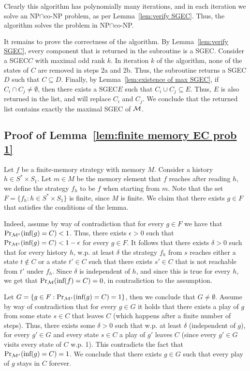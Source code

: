 \documentclass[runningheads,a4paper]{llncs}
\newcommand{\set}[1]{{\{#1\}}}
\newcommand{\M}{{\cal M}}
\newcommand{\Inf}{\mbox{inf}}
\newcommand{\sgec}{{SGEC}\xspace}
\begin{document}
Clearly this algorithm has polynomially many iterations, and in each iteration we solve an NP$\cap$co-NP problem, as per Lemma~\ref{lem:verify SGEC}. Thus, the algorithm solves the problem in NP$\cap$co-NP.

It remains to prove the correctness of the algorithm.
By Lemma~\ref{lem:verify SGEC}, every component that is returned in the subroutine is a \sgec. Consider a \sgec $C$ with maximal odd rank $k$. In iteration $k$ of the algorithm, none of the states of $C$ are removed in steps 2a and 2b. Thus, the subroutine returns a \sgec $D$ such that $C\subseteq D$. Finally, by Lemma~\ref{lem:existence of max SGEC}, if $C_i\cap C_j\neq \emptyset$, then there exists a \sgec $E$ such that $C_i\cup C_j\subseteq E$. Thus, $E$ is also returned in the list, and will replace $C_i$ and $C_j$.
We conclude that the returned list contains exactly the maximal \sgec of $\M$.


\subsection{Proof of Lemma~\ref{lem:finite memory EC prob 1}}
\label{apx:finite memory EC prob 1}
Let $f$ be a finite-memory strategy with memory $M$. Consider a history $h\in S^*\times S_1$. Let $m\in M$ be the memory element that $f$ reaches after reading $h$, we define the strategy $f_h$ to be $f$ when starting from $m$. Note that the set $F=\set{f_h:h\in S^*\times S_1}$ is finite, since $M$ is finite.
We claim that there exists $g\in F$ that satisfies the conditions of the lemma. 

Indeed, assume by way of contradiction that for every $g\in F$ we have that $\Pr_{\M^s}(\Inf(g)=C)<1$. Thus, there exists $\epsilon>0$ such that $\Pr_{\M^s}(\Inf(g)=C)< 1-\epsilon$ for every $g\in F$. It follows that there exists $\delta>0$ such that for every history $h$, w.p. at least $\delta$ the strategy $f_h$ from $s$ reaches either a state $t\notin C$ or a state $t'\in C$ such that there exists $s'\in C$ that is not reachable from $t'$ under $f_h$. Since $\delta$ is independent of $h$, and since this is true for every $h$, we get that $\Pr_\M(\Inf(f)=C)=0$, in contradiction to the assumption. 

Let $G=\set{g\in F: \Pr_{\M^s}(\Inf(g)=C)=1}$, then we conclude that $G\neq \emptyset$. Assume by way of contradiction that for every $g\in G$ it holds that there exists a play of $g$ from some state $s\in C$ that leaves $C$ (which happens after a finite number of steps). Thus, there exists some $\delta>0$ such that w.p. at least $\delta$ (independent of $g$), for every $g'\in G$ and every state $s\in C$ a play of $g'$ leaves $C$ (since every $g'\in G$ visits every state of $C$ w.p. 1). This contradicts the fact that $\Pr_{\M^s}(\Inf(g)=C)=1$. 
We conclude that there exists $g\in G$ such that every play of $g$ stays in $C$ forever. 
\end{document}
